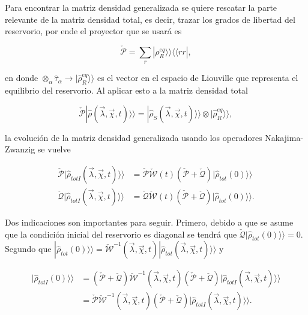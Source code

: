 \begin{appendixs}
Para encontrar la matriz densidad generalizada se quiere rescatar la parte relevante de la matriz densidad total, es decir, trazar los grados de libertad del reservorio, por ende el proyector que se usará es 

\begin{equation*}
    \check{\mathcal{P}} = \sum_{r}|\rho_{R}^{eq} \rangle \rangle \langle \langle rr|,
\end{equation*}

en donde $\otimes_{\alpha} \hat{\tau}_{\alpha} \to  |\hat{\rho}_{R}^{eq} \rangle \rangle$ es el vector en el espacio de Liouville que representa el equilibrio del reservorio. Al aplicar esto a la matriz densidad total

\begin{equation*}
    \check{\mathcal{P}}|\hat{\rho}(\vec{\lambda},\vec{\chi},t) \rangle \rangle = |\hat{\rho}_{S}(\vec{\lambda},\vec{\chi},t)\rangle \rangle \otimes |\hat{\rho}^{eq}_{R}\rangle \rangle ,
\end{equation*}

la evolución de la matriz densidad generalizada usando los operadores Nakajima-Zwanzig se vuelve 

\begin{align}
    \check{\mathcal{P}}|\hat{\rho}_{totI}(\vec{\lambda},\vec{\chi},t)\rangle \rangle & =  \check{\mathcal{P}} \check{\mathcal{W}}(t)( \check{\mathcal{P}} +  \check{\mathcal{Q}})|\hat{\rho}_{tot}(0)\rangle \rangle  \label{apendix2proyectionev1} \\
    \check{\mathcal{Q}}|\hat{\rho}_{totI}(\vec{\lambda},\vec{\chi},t)\rangle \rangle & = \check{\mathcal{Q}} \check{\mathcal{W}}(t)( \check{\mathcal{P}} +  \check{\mathcal{Q}})|\hat{\rho}_{tot}(0)\rangle \rangle. 
\label{apendix2proyectionev}
\end{align}

Dos indicaciones son importantes para seguir. Primero, debido a que se asume que la condición inicial del reservorio es diagonal se tendrá que $\check{\mathcal{Q}}|\hat{\rho}_{tot}(0)\rangle\rangle = 0 $. Segundo 
 que $|\hat{\rho}_{tot}(0)\rangle \rangle = \check{\mathcal{W}}^{-1}(\vec{\lambda},\vec{\chi},t)|\hat{\rho}_{tot}(\vec{\lambda},\vec{\chi},t)\rangle \rangle$ y

\begin{align*}
    |\hat{\rho}_{totI}(0)\rangle \rangle & = (\check{\mathcal{P}} + \check{\mathcal{Q}} )\check{\mathcal{W}}^{-1}(\vec{\lambda},\vec{\chi},t)(\check{\mathcal{P}} + \check{\mathcal{Q}})|\hat{\rho}_{totI}(\vec{\lambda},\vec{\chi},t)\rangle \rangle \\
        & = \check{\mathcal{P}}\check{\mathcal{W}}^{-1}(\vec{\lambda},\vec{\chi},t)(\check{\mathcal{P}} + \check{\mathcal{Q}})|\hat{\rho}_{totI}(\vec{\lambda},\vec{\chi},t)\rangle \rangle.
\end{align*}


\end{appendixs}
